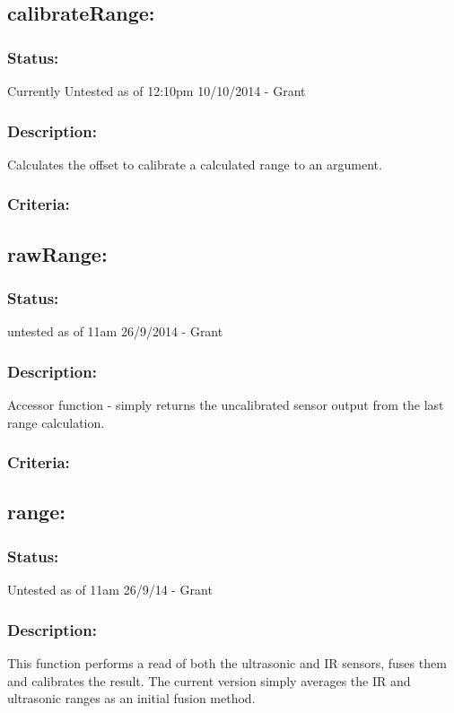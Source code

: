 \documentclass[]{report}
\begin{document}
\subsection{calibrateRange:}
\subsubsection{Status:}
Currently Untested as of 12:10pm 10/10/2014 - Grant

\subsubsection{Description:}
Calculates the offset to calibrate a calculated range to an argument.

\subsubsection{Criteria:}

\subsection{rawRange:}
\subsubsection{Status:}
untested as of 11am 26/9/2014 - Grant

\subsubsection{Description:}
Accessor function - simply returns the uncalibrated sensor output from the last range calculation.

\subsubsection{Criteria:}

\subsection{range:}
\subsubsection{Status:}
Untested as of 11am 26/9/14 - Grant

\subsubsection{Description:}
This function performs a read of both the ultrasonic and IR sensors, fuses them and calibrates the result. The current version simply averages the IR and ultrasonic ranges as an initial fusion method.
\end{document}
